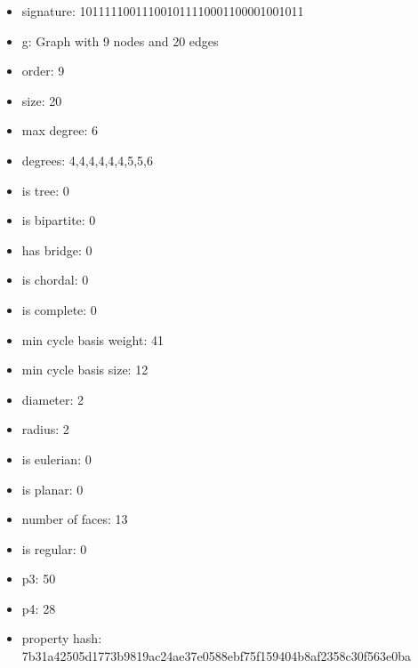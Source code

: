 \newpage
\begin{figure}
\end{figure}
\begin{itemize}
\item signature: 101111100111001011110001100001001011
\item g: Graph with 9 nodes and 20 edges
\item order: 9
\item size: 20
\item max degree: 6
\item degrees: 4,4,4,4,4,4,5,5,6
\item is tree: 0
\item is bipartite: 0
\item has bridge: 0
\item is chordal: 0
\item is complete: 0
\item min cycle basis weight: 41
\item min cycle basis size: 12
\item diameter: 2
\item radius: 2
\item is eulerian: 0
\item is planar: 0
\item number of faces: 13
\item is regular: 0
\item p3: 50
\item p4: 28
\item property hash: 7b31a42505d1773b9819ac24ae37e0588ebf75f159404b8af2358c30f563e0ba
\end{itemize}
